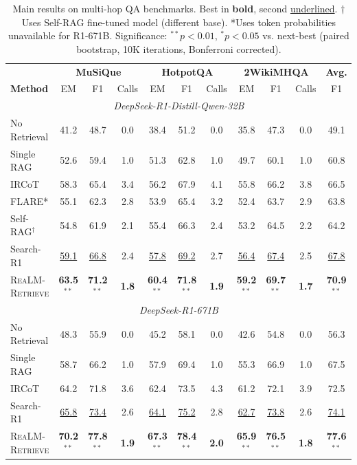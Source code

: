 \documentclass[sigconf,natbib=true]{acmart}
\newcommand{\methodname}{\textsc{ReaLM-Retrieve}}
\begin{document}
\begin{table}[t]
\small
\centering
\caption{Main results on multi-hop QA benchmarks. Best in \textbf{bold}, second \underline{underlined}. $\dagger$Uses Self-RAG fine-tuned model (different base). *Uses token probabilities unavailable for R1-671B. Significance: $^{**}p<0.01$, $^{*}p<0.05$ vs. next-best (paired bootstrap, 10K iterations, Bonferroni corrected).}
\label{tab:main_results}
\begin{tabular}{@{}l|ccc|ccc|ccc|c@{}}
\toprule
& \multicolumn{3}{c|}{\textbf{MuSiQue}} & \multicolumn{3}{c|}{\textbf{HotpotQA}} & \multicolumn{3}{c|}{\textbf{2WikiMHQA}} & \textbf{Avg.} \\
\textbf{Method} & EM & F1 & Calls & EM & F1 & Calls & EM & F1 & Calls & F1 \\
\midrule
\multicolumn{11}{c}{\textit{DeepSeek-R1-Distill-Qwen-32B}} \\
\midrule
No Retrieval & 41.2 & 48.7 & 0.0 & 38.4 & 51.2 & 0.0 & 35.8 & 47.3 & 0.0 & 49.1 \\
Single RAG & 52.6 & 59.4 & 1.0 & 51.3 & 62.8 & 1.0 & 49.7 & 60.1 & 1.0 & 60.8 \\
IRCoT & 58.3 & 65.4 & 3.4 & 56.2 & 67.9 & 4.1 & 55.8 & 66.2 & 3.8 & 66.5 \\
FLARE* & 55.1 & 62.3 & 2.8 & 53.9 & 65.4 & 3.2 & 52.4 & 63.7 & 2.9 & 63.8 \\
Self-RAG$^\dagger$ & 54.8 & 61.9 & 2.1 & 55.4 & 66.3 & 2.4 & 53.2 & 64.5 & 2.2 & 64.2 \\
Search-R1 & \underline{59.1} & \underline{66.8} & 2.4 & \underline{57.8} & \underline{69.2} & 2.7 & \underline{56.4} & \underline{67.4} & 2.5 & \underline{67.8} \\
\methodname{} & \textbf{63.5}$^{**}$ & \textbf{71.2}$^{**}$ & \textbf{1.8} & \textbf{60.4}$^{**}$ & \textbf{71.8}$^{**}$ & \textbf{1.9} & \textbf{59.2}$^{**}$ & \textbf{69.7}$^{**}$ & \textbf{1.7} & \textbf{70.9}$^{**}$ \\
\midrule
\multicolumn{11}{c}{\textit{DeepSeek-R1-671B}} \\
\midrule
No Retrieval & 48.3 & 55.9 & 0.0 & 45.2 & 58.1 & 0.0 & 42.6 & 54.8 & 0.0 & 56.3 \\
Single RAG & 58.7 & 66.2 & 1.0 & 57.9 & 69.4 & 1.0 & 55.3 & 66.9 & 1.0 & 67.5 \\
IRCoT & 64.2 & 71.8 & 3.6 & 62.4 & 73.5 & 4.3 & 61.2 & 72.1 & 3.9 & 72.5 \\
Search-R1 & \underline{65.8} & \underline{73.4} & 2.6 & \underline{64.1} & \underline{75.2} & 2.8 & \underline{62.7} & \underline{73.8} & 2.6 & \underline{74.1} \\
\methodname{} & \textbf{70.2}$^{**}$ & \textbf{77.8}$^{**}$ & \textbf{1.9} & \textbf{67.3}$^{**}$ & \textbf{78.4}$^{**}$ & \textbf{2.0} & \textbf{65.9}$^{**}$ & \textbf{76.5}$^{**}$ & \textbf{1.8} & \textbf{77.6}$^{**}$ \\
\bottomrule
\end{tabular}
\end{table}
\end{document}
